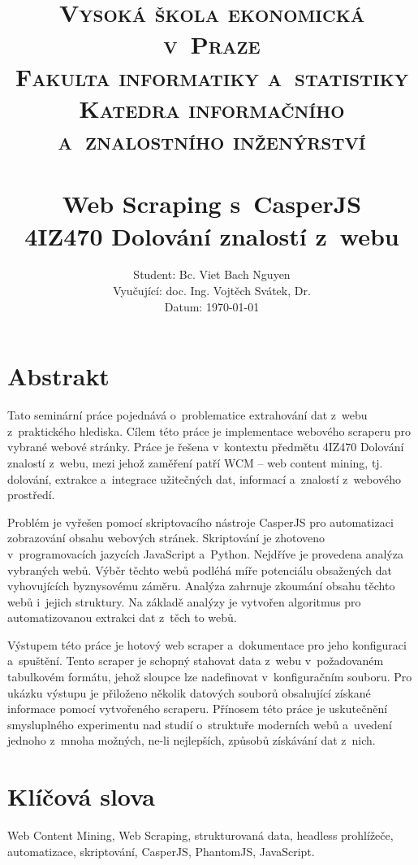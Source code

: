 \documentclass[11pt,a4paper]{article}
\title{   \normalsize\textsc {
          \large{Vysoká škola ekonomická v~Praze}\\[0.3cm]    
          \large{Fakulta informatiky a~statistiky}\\[0.3cm]
          \large{Katedra informačního a~znalostního inženýrství}\\
        }
\textsc{}                                               %
            \\[7.0cm]                                   %
            \huge \textbf{Web Scraping s~CasperJS}      %
            \HRule{2pt} \\ [0.4cm]                      %
            \normalsize \textbf{4IZ470 Dolování znalostí z~webu}
        }
\author{\raggedright
        Student: Bc. Viet Bach Nguyen \\
        Vyučující: doc. Ing. Vojtěch Svátek, Dr. \\
        Datum: \today
}
\makeatletter
\def\printtitle{                       
    {\centering \@title\par}}
\def\printauthor{                   
    {\centering \large \@author}}
\makeatother
\begin{document}
\thispagestyle{empty}           %

\printtitle                     %
      \vfill
\printauthor                    %
\newpage


\setcounter{page}{1}

\section*{Abstrakt}
Tato seminární práce pojednává o~problematice extrahování dat z~webu z~praktického hlediska. Cílem této práce je implementace webového scraperu pro vybrané webové stránky. Práce je řešena v~kontextu předmětu 4IZ470 Dolování znalostí z~webu, mezi jehož zaměření patří WCM -- web content mining, tj. dolování, extrakce a~integrace užitečných dat, informací a~znalostí z~webového prostředí. 

Problém je vyřešen pomocí skriptovacího nástroje CasperJS pro automatizaci zobrazování obsahu webových stránek. Skriptování je zhotoveno v~programovacích jazycích JavaScript a~Python. Nejdříve je provedena analýza vybraných webů. Výběr těchto webů podléhá míře potenciálu obsažených dat vyhovujících byznysovému záměru. Analýza zahrnuje zkoumání obsahu těchto webů i~jejich struktury. Na základě analýzy je vytvořen algoritmus pro automatizovanou extrakci dat z~těch to webů. 

Výstupem této práce je hotový web scraper a~dokumentace pro jeho konfiguraci a~spuštění. Tento scraper je schopný stahovat data z~webu v~požadovaném tabulkovém formátu, jehož sloupce lze nadefinovat v~konfiguračním souboru. Pro ukázku výstupu je přiloženo několik datových souborů obsahující získané informace pomocí vytvořeného scraperu. Přínosem této práce je uskutečnění smysluplného experimentu nad studií o~struktuře moderních webů a~uvedení jednoho z~mnoha možných, ne-li nejlepších, způsobů získávání dat z~nich.

\section*{Klíčová slova}
Web Content Mining, Web Scraping, strukturovaná data, headless prohlížeče,\\ automatizace, skriptování, CasperJS, PhantomJS, JavaScript.

\newpage

 
\tableofcontents

\newpage
\end{document}
